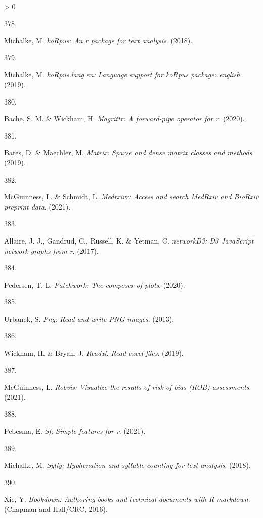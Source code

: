 \documentclass[a4paper, twoside]{templates/ociamthesis}
\newlength{\cslhangindent}
\newlength{\csllabelwidth}
\newenvironment{CSLReferences}[3] %
 {%
  \setlength{\parindent}{0pt}
  \ifodd #1 \everypar{\setlength{\hangindent}{\cslhangindent}}\ignorespaces\fi
  \ifnum #2 > 0
  \setlength{\parskip}{#2\baselineskip}
  \fi
 }%
 {}
\newcommand{\CSLLeftMargin}[1]{\parbox[t]{\maxof{\widthof{#1}}{\csllabelwidth}}{#1}}
\newcommand{\CSLRightInline}[1]{\parbox[t]{\linewidth - \csllabelwidth}{#1}}
\begin{document}
\begin{CSLReferences}{0}{0}
\leavevmode\hypertarget{ref-R-koRpus}{}%
\CSLLeftMargin{378. }
\CSLRightInline{Michalke, M. \emph{{koRpus}: An r package for text analysis}. (2018).}

\leavevmode\hypertarget{ref-R-koRpus.lang.en}{}%
\CSLLeftMargin{379. }
\CSLRightInline{Michalke, M. \emph{{koRpus}.lang.en: Language support for {koRpus} package: english}. (2019).}

\leavevmode\hypertarget{ref-R-magrittr}{}%
\CSLLeftMargin{380. }
\CSLRightInline{Bache, S. M. \& Wickham, H. \emph{Magrittr: A forward-pipe operator for r}. (2020).}

\leavevmode\hypertarget{ref-R-Matrix}{}%
\CSLLeftMargin{381. }
\CSLRightInline{Bates, D. \& Maechler, M. \emph{Matrix: Sparse and dense matrix classes and methods}. (2019).}

\leavevmode\hypertarget{ref-R-medrxivr}{}%
\CSLLeftMargin{382. }
\CSLRightInline{McGuinness, L. \& Schmidt, L. \emph{Medrxivr: Access and search {MedRxiv} and {BioRxiv} preprint data}. (2021).}

\leavevmode\hypertarget{ref-R-networkD3}{}%
\CSLLeftMargin{383. }
\CSLRightInline{Allaire, J. J., Gandrud, C., Russell, K. \& Yetman, C. \emph{{networkD3}: D3 {JavaScript} network graphs from r}. (2017).}

\leavevmode\hypertarget{ref-R-patchwork}{}%
\CSLLeftMargin{384. }
\CSLRightInline{Pedersen, T. L. \emph{Patchwork: The composer of plots}. (2020).}

\leavevmode\hypertarget{ref-R-png}{}%
\CSLLeftMargin{385. }
\CSLRightInline{Urbanek, S. \emph{Png: Read and write {PNG} images}. (2013).}

\leavevmode\hypertarget{ref-R-readxl}{}%
\CSLLeftMargin{386. }
\CSLRightInline{Wickham, H. \& Bryan, J. \emph{Readxl: Read excel files}. (2019).}

\leavevmode\hypertarget{ref-R-robvis}{}%
\CSLLeftMargin{387. }
\CSLRightInline{McGuinness, L. \emph{Robvis: Visualize the results of risk-of-bias ({ROB}) assessments}. (2021).}

\leavevmode\hypertarget{ref-R-sf}{}%
\CSLLeftMargin{388. }
\CSLRightInline{Pebesma, E. \emph{Sf: Simple features for r}. (2021).}

\leavevmode\hypertarget{ref-R-sylly}{}%
\CSLLeftMargin{389. }
\CSLRightInline{Michalke, M. \emph{Sylly: Hyphenation and syllable counting for text analysis}. (2018).}

\leavevmode\hypertarget{ref-bookdown2016}{}%
\CSLLeftMargin{390. }
\CSLRightInline{Xie, Y. \emph{Bookdown: Authoring books and technical documents with {R} markdown}. ({Chapman and Hall/CRC}, 2016).}


\end{CSLReferences}
\end{document}
